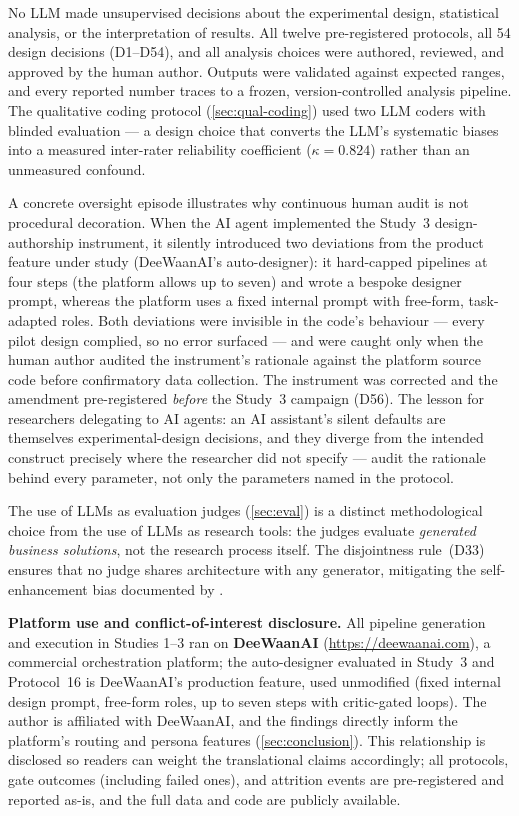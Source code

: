 \documentclass[12pt,a4paper]{article}
\begin{document}
No LLM made unsupervised decisions about the experimental design, statistical
analysis, or the interpretation of results. All twelve pre-registered protocols,
all 54 design decisions (D1--D54), and all analysis choices were authored,
reviewed, and approved by the human author. Outputs were
validated against expected ranges, and every reported number traces to a frozen,
version-controlled analysis pipeline. The qualitative coding protocol
(\cref{sec:qual-coding}) used two LLM coders with blinded evaluation --- a
design choice that converts the LLM's systematic biases into a measured
inter-rater reliability coefficient ($\kappa = 0.824$) rather than an unmeasured
confound.

A concrete oversight episode illustrates why continuous human audit is not
procedural decoration. When the AI agent implemented the Study~3
design-authorship instrument, it silently introduced two deviations from the
product feature under study (DeeWaanAI's auto-designer): it hard-capped
pipelines at four steps (the platform allows up to seven) and wrote a bespoke
designer prompt, whereas the platform uses a fixed internal prompt with
free-form, task-adapted roles. Both deviations were invisible in the code's
behaviour --- every pilot design complied, so no error surfaced --- and were
caught only when the human author audited the instrument's rationale against
the platform source code before confirmatory data collection. The instrument
was corrected and the amendment pre-registered \emph{before} the Study~3
campaign (D56). The lesson for researchers delegating to AI agents: an AI
assistant's silent defaults are themselves experimental-design decisions, and
they diverge from the intended construct precisely where the researcher did
not specify --- audit the rationale behind every parameter, not only the
parameters named in the protocol.

The use of LLMs as evaluation judges (\cref{sec:eval}) is a distinct
methodological choice from the use of LLMs as research tools: the judges
evaluate \emph{generated business solutions}, not the research process itself.
The disjointness rule~(D33) ensures that no judge shares architecture with any
generator, mitigating the self-enhancement bias documented by
\citet{ZhengEtAl2023}.

\textbf{Platform use and conflict-of-interest disclosure.} All pipeline
generation and execution in Studies 1--3 ran on \textbf{DeeWaanAI}
(\url{https://deewaanai.com}), a commercial orchestration platform; the
auto-designer evaluated in Study~3 and Protocol~16 is DeeWaanAI's production
feature, used unmodified (fixed internal design prompt, free-form roles,
up to seven steps with critic-gated loops). The author is affiliated with
DeeWaanAI, and the findings directly inform the platform's routing and
persona features (\cref{sec:conclusion}). This relationship is disclosed so
readers can weight the translational claims accordingly; all protocols,
gate outcomes (including failed ones), and attrition events are
pre-registered and reported as-is, and the full data and code are publicly
available.
\end{document}
